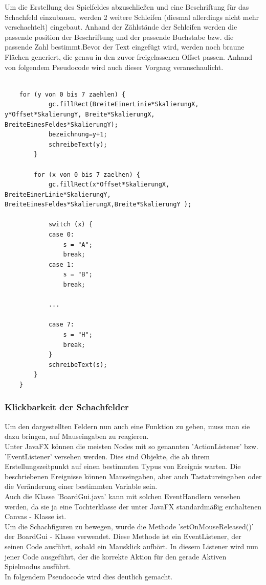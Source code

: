 \documentclass[12pt,a4paper]{article}
\begin{document}
{\begin{lstlisting}
\end{lstlisting}
Um die Erstellung des Spielfeldes abzuschließen und eine Beschriftung für das Schachfeld einzubauen, werden 2 weitere Schleifen (diesmal allerdings nicht mehr verschachtelt) eingebaut. Anhand der Zählstände der Schleifen werden die passende position der Beschriftung und der passende Buchstabe bzw. die passende Zahl bestimmt.Bevor der Text eingefügt wird, werden noch braune Flächen generiert, die genau in den zuvor freigelassenen Offset passen.
Anhand von folgendem Pseudocode wird auch dieser Vorgang veranschaulicht.
\lstset{language=java}
\begin{lstlisting}

	for (y von 0 bis 7 zaehlen) { 
			gc.fillRect(BreiteEinerLinie*SkalierungX, y*Offset*SkalierungY, Breite*SkalierungX, BreiteEinesFeldes*SkalierungY);
			bezeichnung=y+1;
			schreibeText(y);
		}

		for (x von 0 bis 7 zaelhen) {
			gc.fillRect(x*Offset*SkalierungX, BreiteEinerLinie*SkalierungY, BreiteEinesFeldes*SkalierungX,Breite*SkalierungY );

			switch (x) {
			case 0:
				s = "A";
				break;
			case 1:
				s = "B";
				break;
			
			...			
			
			case 7:
				s = "H";
				break;
			}
			schreibeText(s);
		}
	}

\end{lstlisting}
\newpage

\subsubsection{Klickbarkeit der Schachfelder}
\label{SUBSUBSECTION:CLICKABLE}
Um den dargestellten Feldern nun auch eine Funktion zu geben, muss man sie dazu bringen, auf Mauseingaben zu reagieren. \\
Unter JavaFX können die meisten Nodes mit so genannten 'ActionListener' bzw. 'EventListener' versehen werden. Dies sind Objekte, die ab ihrem Erstellungszeitpunkt auf einen bestimmten Typus von Ereignis warten. Die beschriebenen Ereignisse können Mauseingaben, aber auch Tastatureingaben oder die Veränderung einer bestimmten Variable sein. \\
Auch die Klasse 'BoardGui.java' kann mit solchen EventHandlern versehen werden, da sie ja eine Tochterklasse der unter JavaFX standardmäßig enthaltenen Canvas - Klasse ist.\\
Um die Schachfiguren zu bewegen, wurde die Methode 'setOnMouseReleased()' der BoardGui - Klasse verwendet. Diese Methode ist ein EventListener, der seinen Code ausführt, sobald ein Mausklick aufhört.
In diesem Listener wird nun jener Code ausgeführt, der die korrekte Aktion für den gerade Aktiven Spielmodus ausführt. \\
In folgendem Pseudocode wird dies deutlich gemacht.

}
\end{document}
